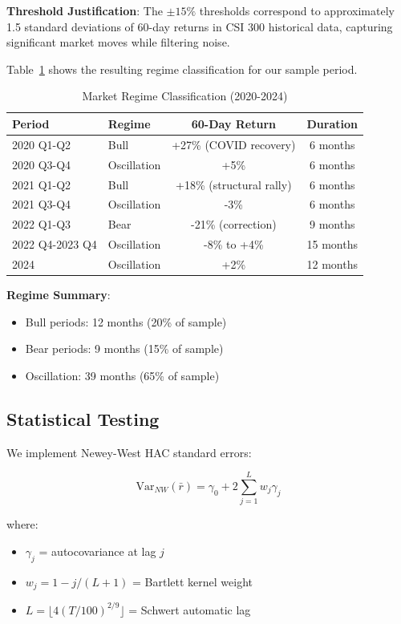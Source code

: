 \textbf{Threshold Justification}: The $\pm 15\%$ thresholds correspond to approximately 1.5 standard deviations of 60-day returns in CSI 300 historical data, capturing significant market moves while filtering noise.

Table~\ref{tab:regime_periods} shows the resulting regime classification for our sample period.

\begin{table}[h]
\centering
\caption{Market Regime Classification (2020-2024)}
\label{tab:regime_periods}
\begin{tabular}{llcc}
\toprule
Period & Regime & 60-Day Return & Duration \\
\midrule
2020 Q1-Q2 & Bull & +27\% (COVID recovery) & 6 months \\
2020 Q3-Q4 & Oscillation & +5\% & 6 months \\
2021 Q1-Q2 & Bull & +18\% (structural rally) & 6 months \\
2021 Q3-Q4 & Oscillation & -3\% & 6 months \\
2022 Q1-Q3 & Bear & -21\% (correction) & 9 months \\
2022 Q4-2023 Q4 & Oscillation & -8\% to +4\% & 15 months \\
2024 & Oscillation & +2\% & 12 months \\
\bottomrule
\end{tabular}
\end{table}

\textbf{Regime Summary}:
\begin{itemize}
    \item Bull periods: 12 months (20\% of sample)
    \item Bear periods: 9 months (15\% of sample)
    \item Oscillation: 39 months (65\% of sample)
\end{itemize}

\subsection{Statistical Testing}

We implement Newey-West HAC standard errors:

\begin{equation}
\text{Var}_{NW}(\bar{r}) = \gamma_0 + 2 \sum_{j=1}^{L} w_j \gamma_j
\end{equation}

where:
\begin{itemize}
    \item $\gamma_j$ = autocovariance at lag $j$
    \item $w_j = 1 - j/(L+1)$ = Bartlett kernel weight
    \item $L = \lfloor 4(T/100)^{2/9} \rfloor$ = Schwert automatic lag
\end{itemize}

